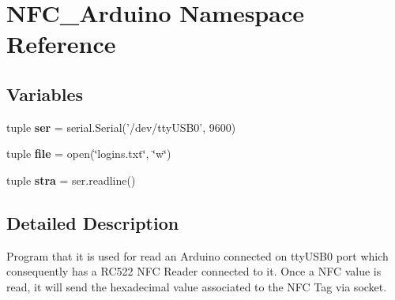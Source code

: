 \hypertarget{namespaceNFC__Arduino}{\section{N\-F\-C\-\_\-\-Arduino Namespace Reference}
\label{namespaceNFC__Arduino}
}
\subsection*{Variables}
\begin{DoxyCompactItemize}
\item 
\hypertarget{namespaceNFC__Arduino_a832a8ee7b57fa3c7d8c4246aaa44e2eb}{tuple {\bfseries ser} = serial.\-Serial('/dev/tty\-U\-S\-B0', 9600)}\label{namespaceNFC__Arduino_a832a8ee7b57fa3c7d8c4246aaa44e2eb}

\item 
\hypertarget{namespaceNFC__Arduino_abf37aca184b7cd2b55d364b0e5953be8}{tuple {\bfseries file} = open(\char`\"{}logins.\-txt\char`\"{}, \char`\"{}w\char`\"{})}\label{namespaceNFC__Arduino_abf37aca184b7cd2b55d364b0e5953be8}

\item 
\hypertarget{namespaceNFC__Arduino_a0f727b9d3472b437ae591c225f0bf456}{tuple {\bfseries stra} = ser.\-readline()}\label{namespaceNFC__Arduino_a0f727b9d3472b437ae591c225f0bf456}

\end{DoxyCompactItemize}


\subsection{Detailed Description}
\begin{DoxyVerb}Program that it is used for read an Arduino connected on ttyUSB0 port which consequently has a RC522 NFC Reader connected to it.
Once a NFC value is read, it will send the hexadecimal value associated to the NFC Tag via socket.
\end{DoxyVerb}
 